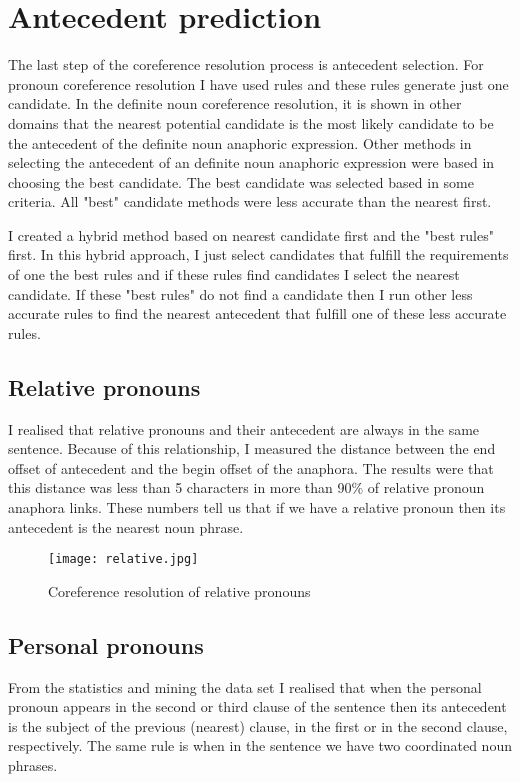 \section{Antecedent prediction}
The last step of the coreference resolution process is antecedent selection. For pronoun coreference resolution I have used rules and these rules generate just one candidate. In the definite noun coreference resolution, it is shown in other domains that the nearest potential candidate is the most likely candidate to be the antecedent of the definite noun anaphoric expression. Other methods in selecting the antecedent of an definite noun anaphoric expression were based in choosing the best candidate. The best candidate was selected based in some criteria. All  "best" candidate methods were less accurate than the nearest first. 
 
I created a hybrid method based on nearest candidate first and the "best rules" first. In this hybrid approach, I just select candidates that fulfill the requirements of one the best rules and if these rules find candidates I select the nearest candidate. If these "best rules" do not find a candidate then I run other less accurate rules to find the nearest  antecedent that fulfill one of these less accurate rules.   

\subsection{Relative pronouns}
I realised that relative pronouns and their antecedent are always in the same sentence. Because of this relationship, I measured the distance between the end offset of antecedent and the begin offset of the anaphora. The results were that this distance was less than 5 characters in more than 90\% of relative pronoun anaphora links. These numbers tell us that if we have a relative pronoun then its antecedent is the nearest noun phrase.

\begin{figure}[h]
  \begin{center}
	 \texttt{[image: relative.jpg]} 
 	 \caption[Coreference resolution of relative pronouns]{Coreference resolution of relative pronouns}
	 \label{Figure 11}
  \end{center}
\end{figure}
 
\subsection{Personal pronouns} 
From the statistics and mining the data set I realised that when  the personal pronoun appears in the second or third clause of the sentence then its antecedent is the  subject of the previous (nearest) clause, in the first or in the second clause, respectively.  The same rule is when in the sentence we have two coordinated noun phrases. 

